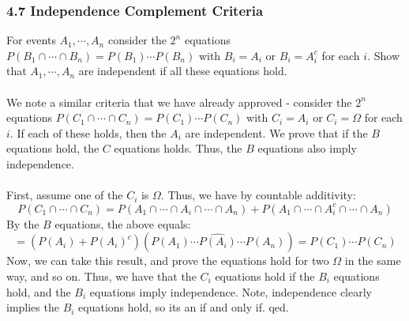 \documentclass[12pt,a4paper]{article}
\newcommand{\1}[1]{\mathbbm{1}\left\{ #1 \right\}}
\begin{document}
\subsubsection{4.7 Independence Complement Criteria} For events $A_1, \cdots, A_n$ consider the $2^n$ equations $P(B_1 \cap \cdots \cap B_n) = P(B_1) \cdots P(B_n)$ with $B_i = A_i$ or $B_i = A_i^c$ for each $i$. Show that $A_1, \cdots, A_n$ are independent if all these equations hold.
\\\\
We note a similar criteria that we have already approved - consider the $2^n$ equations $P(C_1 \cap \cdots \cap C_n) = P(C_1) \cdots P(C_n)$ with $C_i = A_i$ or $C_i = \Omega$ for each $i$. If each of these holds, then the $A_i$ are independent. We prove that if the $B$ equations hold, the $C$ equations holds. Thus, the $B$ equations also imply independence.
\\\\
First, assume one of the $C_i$ is $\Omega$. Thus, we have by countable additivity:
$$
	P(C_1 \cap \cdots \cap C_n) = 
	P(A_1 \cap \cdots \cap A_i \cap \cdots \cap A_n) + 
	P(A_1 \cap \cdots \cap A_i^c \cap \cdots \cap A_n)
$$
By the $B$ equations, the above equals:
$$
	= (P(A_i) + P(A_i)^c)(P(A_1) \cdots \widehat{P(A_i)} \cdots P(A_n)) =
	P(C_1) \cdots P(C_n)
$$
Now, we can take this result, and prove the equations hold for two $\Omega$ in the same way, and so on. Thus, we have that the $C_i$ equations hold if the $B_i$ equations hold, and the $B_i$ equations imply independence. Note, independence clearly implies the $B_i$ equations hold, so its an if and only if. qed.
\end{document}
